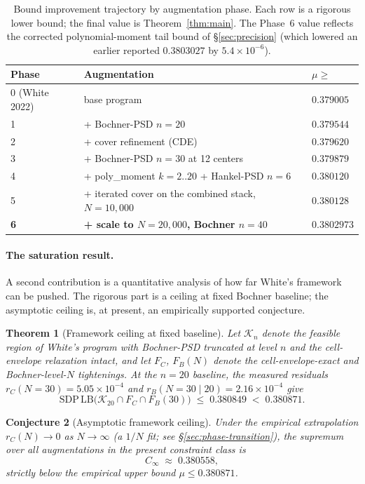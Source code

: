 \documentclass[11pt]{article}
\theoremstyle{plain}
\newtheorem{theorem}{Theorem}
\newtheorem{conjecture}[theorem]{Conjecture}
\theoremstyle{definition}
\begin{document}
\begin{table}[h]
\centering
\begin{tabular}{lll}
\toprule
Phase & Augmentation & $\mu \ge$ \\
\midrule
0 (White 2022) & base program & $0.379005$ \\
1 & + Bochner-PSD $n=20$ & $0.379544$ \\
2 & + cover refinement (CDE) & $0.379620$ \\
3 & + Bochner-PSD $n=30$ at 12 centers & $0.379879$ \\
4 & + poly\_moment $k=2..20$ + Hankel-PSD $n=6$ & $0.380120$ \\
5 & + iterated cover on the combined stack, $N=10{,}000$ & $0.380128$ \\
\textbf{6} & \textbf{+ scale to $N=20{,}000$, Bochner $n=40$} & $\mathbf{0.3802973}$ \\
\bottomrule
\end{tabular}
\caption{Bound improvement trajectory by augmentation phase. Each row
is a rigorous lower bound; the final value is Theorem~\ref{thm:main}.
The Phase~6 value reflects the corrected polynomial-moment tail bound
of \S\ref{sec:precision} (which lowered an earlier reported
$0.3803027$ by $5.4 \times 10^{-6}$).}
\label{tab:trajectory}
\end{table}

\paragraph{The saturation result.}
A second contribution is a quantitative analysis of how far White's
framework can be pushed. The rigorous part is a ceiling at fixed
Bochner baseline; the asymptotic ceiling is, at present, an empirically
supported conjecture.

\begin{theorem}[Framework ceiling at fixed baseline]\label{thm:saturation-informal}
Let $\mathcal{K}_n$ denote the feasible region of White's program with
Bochner-PSD truncated at level $n$ and the cell-envelope relaxation
intact, and let $F_C$, $F_B(N)$ denote the cell-envelope-exact and
Bochner-level-$N$ tightenings. At the $n=20$ baseline, the measured
residuals $r_C(N{=}30) = 5.05\times 10^{-4}$ and $r_B(N{=}30 \mid 20) =
2.16\times 10^{-4}$ give
\[
\mathrm{SDP\,LB}\bigl(\mathcal{K}_{20} \cap F_C \cap F_B(30)\bigr)
\;\le\; 0.380849 \;<\; 0.380871.
\]
\end{theorem}

\begin{conjecture}[Asymptotic framework ceiling]\label{conj:cinf}
Under the empirical extrapolation $r_C(N) \to 0$ as $N \to \infty$
(a $1/N$ fit; see \S\ref{sec:phase-transition}), the
supremum over all augmentations in the present constraint class is
\[
C_\infty \;\approx\; 0.380558,
\]
strictly below the empirical upper bound $\mu \le 0.380871$.
\end{conjecture}
\end{document}
